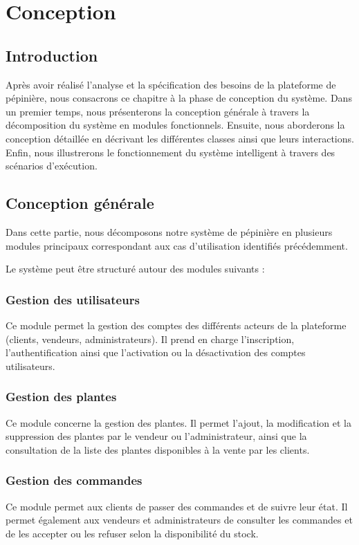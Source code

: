 \chapter{Conception}

\section*{Introduction}

Après avoir réalisé l'analyse et la spécification des besoins de la plateforme de pépinière, nous consacrons ce chapitre à la phase de conception du système.
Dans un premier temps, nous présenterons la conception générale à travers la décomposition du système en modules fonctionnels. Ensuite, nous aborderons la conception détaillée en décrivant les différentes classes ainsi que leurs interactions. Enfin, nous illustrerons le fonctionnement du système intelligent à travers des scénarios d'exécution.


\section{Conception générale}

Dans cette partie, nous décomposons notre système de pépinière en plusieurs modules principaux correspondant aux cas d'utilisation identifiés précédemment.

Le système peut être structuré autour des modules suivants :

\subsection*{Gestion des utilisateurs}
Ce module permet la gestion des comptes des différents acteurs de la plateforme (clients, vendeurs, administrateurs).
Il prend en charge l'inscription, l'authentification ainsi que l'activation ou la désactivation des comptes utilisateurs.

\subsection*{Gestion des plantes}
Ce module concerne la gestion des plantes. Il permet l'ajout, la modification et la suppression des plantes par le vendeur ou l'administrateur, ainsi que la consultation de la liste des plantes disponibles à la vente par les clients.

\subsection*{Gestion des commandes}
Ce module permet aux clients de passer des commandes et de suivre leur état.
Il permet également aux vendeurs et administrateurs de consulter les commandes et de les accepter ou les refuser selon la disponibilité du stock.

